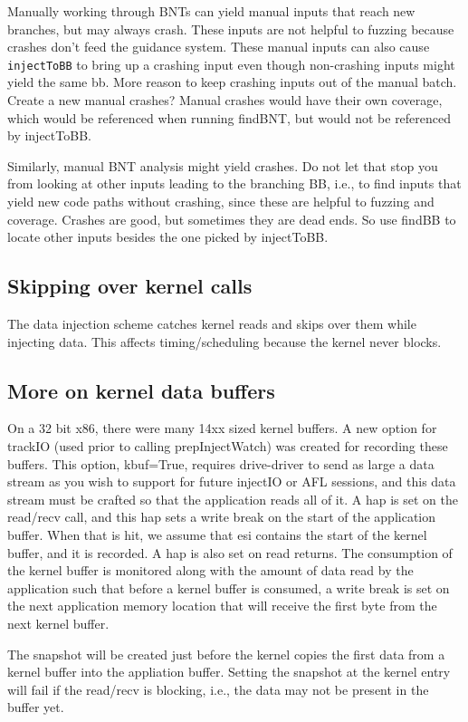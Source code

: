 \documentclass[titlepage]{article}
\begin{document}
\begin{appendices}
Manually working through BNTs can yield manual inputs that reach new branches, but may always crash.  These inputs are not helpful to fuzzing because crashes don't 
feed the guidance system.  These manual inputs can also cause {\tt injectToBB} to bring up a crashing input even though non-crashing inputs might yield the same bb.
More reason to keep crashing inputs out of the manual batch.  Create a new manual crashes?  Manual crashes would have their own coverage, which would be referenced
when running findBNT, but would not be referenced by injectToBB.

Similarly, manual BNT analysis might yield crashes.  Do not let that stop you from looking at other inputs leading to the branching BB, i.e., to find inputs that
yield new code paths without crashing, since these are helpful to fuzzing and coverage.  Crashes are good, but sometimes they are dead ends.  So use findBB to locate other
inputs besides the one picked by injectToBB.


\subsection{Skipping over kernel calls}
The data injection scheme catches kernel reads and skips over them while injecting data.  This affects timing/scheduling because the kernel never
blocks.

\subsection{More on kernel data buffers}
On a 32 bit x86, there were many 14xx sized kernel buffers.  A new option for trackIO (used prior to calling prepInjectWatch) was created for recording these buffers.
This option, kbuf=True, requires drive-driver to send as large a data stream as you wish to support for future injectIO or AFL sessions, and this data stream
must be crafted so that the application reads all of it.  A hap is set on the read/recv call, and this hap sets a write break on the start of the application buffer.  When that is hit, we assume that esi contains the start of the kernel buffer, and it is recorded.  A hap is also set on read returns.  The consumption of the
kernel buffer is monitored along with the amount of data read by the application such that before a kernel buffer is consumed, a write break is set on the next 
application memory location that will receive the first byte from the next kernel buffer.

The snapshot will be created just before the kernel copies the first data from a kernel buffer into the appliation buffer.  Setting the snapshot at the kernel entry will fail if the read/recv
is blocking, i.e., the data may not be present in the buffer yet.


\end{appendices}
\end{document}
